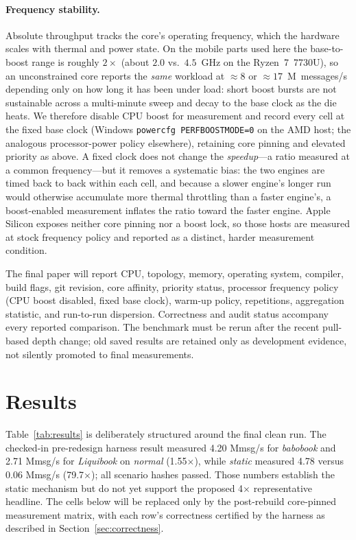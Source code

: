\documentclass[10pt,twocolumn]{article}
\begin{document}
\paragraph{Frequency stability.}  Absolute throughput tracks the core's operating
frequency, which the hardware scales with thermal and power state.  On the mobile
parts used here the base-to-boost range is roughly $2\times$ (about $2.0$ vs.\
$4.5$~GHz on the Ryzen~7~7730U), so an unconstrained core reports the \emph{same}
workload at ${\approx}8$ or ${\approx}17$~M~messages/s depending only on how long
it has been under load: short boost bursts are not sustainable across a
multi-minute sweep and decay to the base clock as the die heats.  We therefore
disable CPU boost for measurement and record every cell at the fixed base clock
(Windows \texttt{powercfg PERFBOOSTMODE=0} on the AMD host; the analogous
processor-power policy elsewhere), retaining core pinning and elevated priority as
above.  A fixed clock does not change the \emph{speedup}---a ratio measured at a
common frequency---but it removes a systematic bias: the two engines are timed
back to back within each cell, and because a slower engine's longer run would
otherwise accumulate more thermal throttling than a faster engine's, a
boost-enabled measurement inflates the ratio toward the faster engine.  Apple
Silicon exposes neither core pinning nor a boost lock, so those hosts are measured
at stock frequency policy and reported as a distinct, harder measurement
condition.

The final paper will report CPU, topology, memory, operating system, compiler,
build flags, git revision, core affinity, priority status, processor frequency
policy (CPU boost disabled, fixed base clock), warm-up policy, repetitions,
aggregation statistic, and run-to-run dispersion.  Correctness and
audit status accompany every reported comparison.  The benchmark must be rerun
after the recent pull-based depth change; old saved results are retained only as
development evidence, not silently promoted to final measurements.

\section{Results}

Table~\ref{tab:results} is deliberately structured around the final clean run.
The checked-in pre-redesign harness result measured 4.20 Mmsg/s for \textit{babobook} and
2.71 Mmsg/s for \textit{Liquibook} on \textit{normal} (1.55$\times$), while
\textit{static} measured 4.78 versus 0.06 Mmsg/s (79.7$\times$); all scenario
hashes passed.  Those numbers establish the static mechanism but do not yet
support the proposed 4$\times$ representative headline.  The cells below will
be replaced only by the post-rebuild core-pinned measurement matrix, with each
row's correctness certified by the harness as described in
Section~\ref{sec:correctness}.
\end{document}
